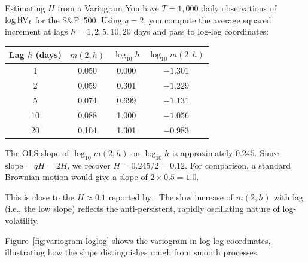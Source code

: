 \begin{workedexample}{Estimating $H$ from a Variogram}
You have $T = 1{,}000$ daily observations of $\log \operatorname{RV}_t$ for the S\&P~500.
Using $q = 2$, you compute the average squared increment at lags $h = 1, 2, 5, 10, 20$ days and pass to log-log coordinates:

\medskip
\begin{center}
\begin{tabular}{@{} c c c c @{}}
\toprule
\textbf{Lag $h$ (days)} & \textbf{$m(2, h)$} & \textbf{$\log_{10} h$} & \textbf{$\log_{10} m(2,h)$} \\
\midrule
1   & 0.050 & 0.000 & $-1.301$ \\
2   & 0.059 & 0.301 & $-1.229$ \\
5   & 0.074 & 0.699 & $-1.131$ \\
10  & 0.088 & 1.000 & $-1.056$ \\
20  & 0.104 & 1.301 & $-0.983$ \\
\bottomrule
\end{tabular}
\end{center}
\medskip

The OLS slope of $\log_{10} m(2,h)$ on $\log_{10} h$ is approximately $0.245$.
Since $\text{slope} = qH = 2H$, we recover $H = 0.245 / 2 = 0.12$.
For comparison, a standard Brownian motion would give a slope of $2 \times 0.5 = 1.0$.

This is close to the $H \approx 0.1$ reported by \citet{GJR2018}.
The slow increase of $m(2,h)$ with lag (i.e., the low slope) reflects the anti-persistent, rapidly oscillating nature of log-volatility.
\end{workedexample}

Figure~\ref{fig:variogram-loglog} shows the variogram in log-log coordinates, illustrating how the slope distinguishes rough from smooth processes.

